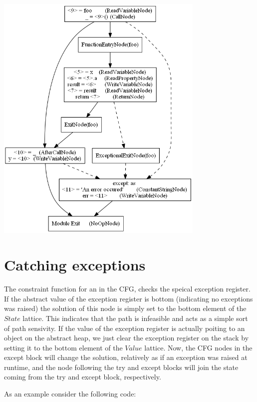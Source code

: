 \begin{listing}[H]
	\begin{center}
		\includegraphics[width=0.75\textwidth]{images/exception1.png}
	\end{center}
	\vspace{-10pt}
\end{listing}


\section{Catching exceptions}
The constraint function for an  in the CFG, checks the speical exception register. If the abstract value of the exception register is bottom (indicating no exceptions was raised) the solution of this node is simply set to the bottom element of the $State$ lattice. This indicates that the path is infeasible and acts as a simple sort of path sensivity. If the value of the exception register is actually poiting to an object on the abstract heap, we just clear the exception register on the stack by setting it to the bottom element of the $Value$ lattice. Now, the CFG nodes in the except block will change the solution, relatively as if an exception was raised at runtime, and the node following the try and except blocks will join the state coming from the try and except block, respectively.

As an example consider the following code:

